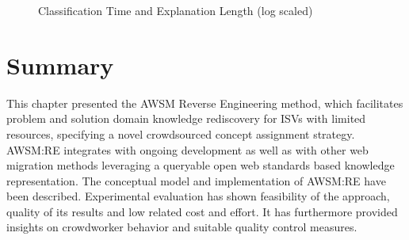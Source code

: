 \begin{figure}
\centering


\caption{Classification Time and Explanation Length (log scaled) \autocite{Heil2019CSRECCIS}}

\label{fig:csre-scatterplots}

\end{figure}

\hypertarget{summary}{%
\section{Summary}\label{summary}}

This chapter presented the AWSM Reverse Engineering method, which facilitates problem and solution domain knowledge rediscovery for ISVs with limited resources, specifying a novel crowdsourced concept assignment strategy.
AWSM:RE integrates with ongoing development as well as with other web migration methods leveraging a queryable open web standards based knowledge representation.
The conceptual model and implementation of AWSM:RE have been described.
Experimental evaluation has shown feasibility of the approach, quality of its results and low related cost and effort.
It has furthermore provided insights on crowdworker behavior and suitable quality control measures.
